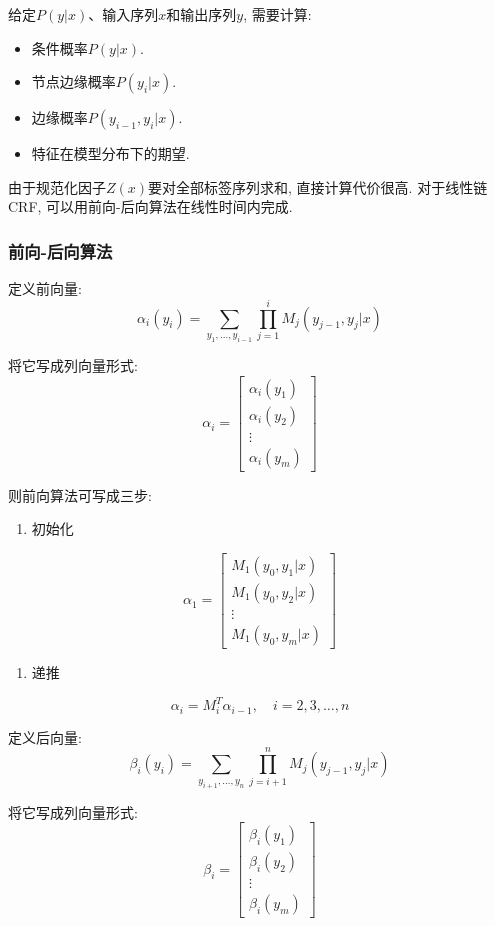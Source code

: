 给定$P(y|x)$、输入序列$x$和输出序列$y$, 需要计算:

\begin{itemize}
\item 条件概率$P(y|x)$.
\item 节点边缘概率$P(y_i|x)$.
\item 边缘概率$P(y_{i-1}, y_i|x)$.
\item 特征在模型分布下的期望.
\end{itemize}

由于规范化因子$Z(x)$要对全部标签序列求和, 直接计算代价很高.
对于线性链CRF, 可以用前向-后向算法在线性时间内完成.

\subsubsection{前向-后向算法}


定义前向量:
\[
\alpha_i (y_i)
    = \sum_{y_1, \dots, y_{i-1}}
      \prod_{j=1}^i M_j (y_{j-1}, y_j | x)
\]

将它写成列向量形式:
\[
\alpha_i = \begin{bmatrix}\alpha_i(y_1) \\ \alpha_i(y_2) \\ \vdots \\ \alpha_i(y_m)\end{bmatrix}
\]

则前向算法可写成三步:

\begin{enumerate}
\item[1.] 初始化
\end{enumerate}
\[
\alpha_1 = \begin{bmatrix}M_1(y_0, y_1 | x) \\ M_1(y_0, y_2 | x) \\ \vdots \\ M_1(y_0, y_m | x)\end{bmatrix}
\]

\begin{enumerate}
\item[2.] 递推
\end{enumerate}
\[
\alpha_i = M_i^T \alpha_{i-1}, \quad i = 2,3,\dots,n
\]

定义后向量:
\[
\beta_i (y_i)
    = \sum_{y_{i+1}, \dots, y_n}
      \prod_{j=i+1}^n M_j (y_{j-1}, y_j | x)
\]

将它写成列向量形式:
\[
\beta_i = \begin{bmatrix}\beta_i(y_1) \\ \beta_i(y_2) \\ \vdots \\ \beta_i(y_m)\end{bmatrix}
\]

